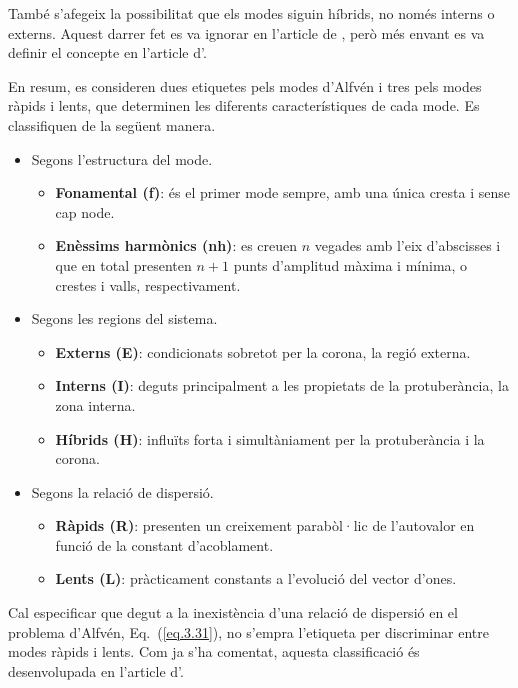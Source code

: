 També s'afegeix la possibilitat que els modes siguin híbrids, no només interns o externs.
Aquest darrer fet es va ignorar en l'article de \textcite{oscillation_modes_II}, però més envant es va definir el concepte en l'article d'\textcite{oscillations_quiescent_solar_prominence}.

En resum, es consideren dues etiquetes pels modes d'Alfvén i tres pels modes ràpids i lents,
que determinen les diferents característiques de cada mode.
Es classifiquen de la següent manera.
\begin{itemize}
	\item Segons l'estructura del mode.
	\begin{itemize}
		\item \textbf{Fonamental (f)}: és el primer mode sempre, amb una única cresta i sense cap node.
		\item \textbf{Enèssims harmònics (nh)}: es creuen $n$ vegades amb l'eix d'abscisses i que en total presenten $n + 1$ punts d'amplitud màxima i mínima, o crestes i valls, respectivament.
	\end{itemize}
	
	\item Segons les regions del sistema.
	\begin{itemize}
		\item \textbf{Externs (E)}: condicionats sobretot per la corona, la regió externa.
		\item \textbf{Interns (I)}: deguts principalment a les propietats de la protuberància, la zona interna.
		\item \textbf{Híbrids (H)}: influïts forta i simultàniament per la protuberància i la corona.
	\end{itemize}
	
	\item Segons la relació de dispersió.
	\begin{itemize}
		\item \textbf{Ràpids (R)}: presenten un creixement parabòl·lic de l'autovalor en funció de la constant d'acoblament.
		\item \textbf{Lents (L)}: pràcticament constants a l'evolució del vector d'ones.
	\end{itemize}
\end{itemize}
Cal especificar que degut a la inexistència d'una relació de dispersió en el problema d'Alfvén, Eq.~(\ref{eq.3.31}),
no s'empra l'etiqueta per discriminar entre modes ràpids i lents.
Com ja s'ha comentat, aquesta classificació és desenvolupada en l'article d'\textcite{oscillations_quiescent_solar_prominence}.



